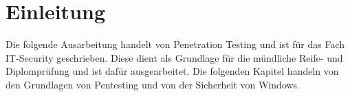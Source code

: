 \section{Einleitung}
Die folgende Ausarbeitung handelt von Penetration Testing und ist für das Fach IT-Security geschrieben. Diese dient als Grundlage für die mündliche Reife- und Diplomprüfung und ist dafür ausgearbeitet. Die folgenden Kapitel handeln von den Grundlagen von Pentesting und von der Sicherheit von Windows.